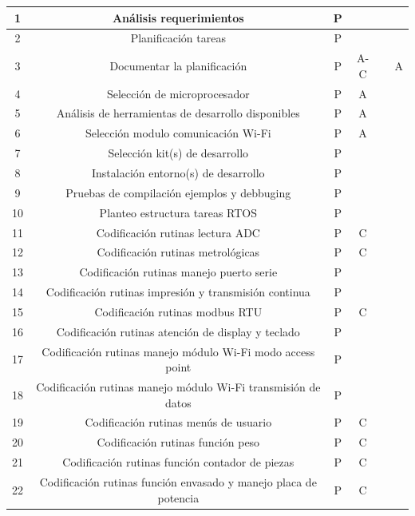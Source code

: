 \documentclass[11pt]{charter}
\begin{document}
\begin{table}[htpb]
{\begin{tabular}{|c|c|c|c|c|c|}
1 & Análisis requerimientos					         & P &  &  &  \\ \hline
2 & Planificación tareas   					         & P &  &  &  \\ \hline
3 & Documentar la planificación				         & P & A-C&  & A \\ \hline
4 & Selección de microprocesador				         & P & A&  &  \\ \hline
5 & Análisis de herramientas de desarrollo disponibles & P & A&  &  \\ \hline 
6 & Selección modulo comunicación Wi-Fi		         & P & A&  &  \\ \hline
7 & Selección kit(s) de desarrollo                     & P &  &  &  \\ \hline
8 & Instalación entorno(s) de desarrollo               & P &  &  &  \\ \hline 
9 & Pruebas de compilación ejemplos y debbuging        & P &  &  &  \\ \hline
10 & Planteo estructura tareas RTOS                    & P &  &  &  \\ \hline
11 & Codificación rutinas lectura ADC                  & P & C&  &  \\ \hline
12 & Codificación rutinas metrológicas                 & P & C&  &  \\ \hline
13 & Codificación rutinas manejo puerto serie          & P &  &  &  \\ \hline
14 & Codificación rutinas impresión y transmisión continua          & P &  &  &  \\
15 & Codificación rutinas modbus RTU                                & P & C&  &  \\ \hline
16 & Codificación rutinas atención de display y teclado             & P &  &  &  \\ \hline
17 & Codificación rutinas manejo módulo Wi-Fi modo access point     & P &  &  &  \\ \hline
18 & Codificación rutinas manejo módulo Wi-Fi transmisión de datos  & P &  &  &  \\ \hline
19 & Codificación rutinas menús de usuario                          & P & C&  &  \\ \hline
20 & Codificación rutinas función peso                              & P & C&  &  \\ \hline
21 & Codificación rutinas función contador de piezas                & P & C&  &  \\ \hline
22 & Codificación rutinas función envasado y manejo placa de potencia & P & C &  &  \\ \hline

\end{tabular}}
\end{table}
\end{document}
